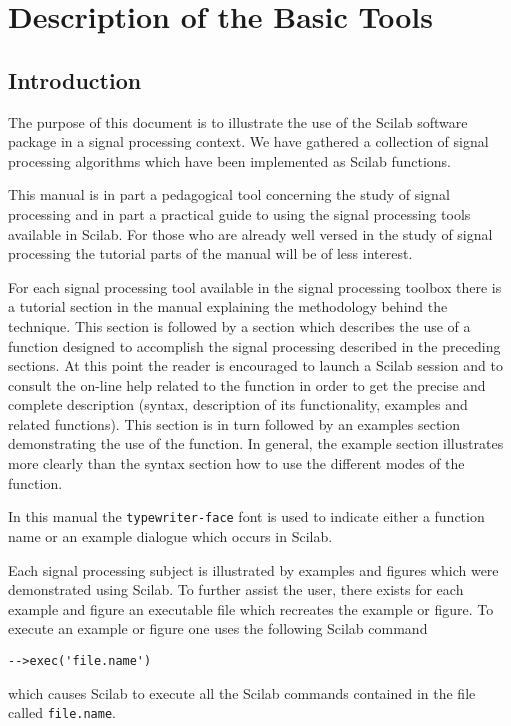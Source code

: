 
\chapter{Description of the Basic Tools}

\section{Introduction}

The purpose of this document is to illustrate the use of the Scilab software
package
in a signal processing context.
We have gathered a collection of signal processing 
algorithms which have been implemented 
as Scilab functions. 

	This manual is in part a pedagogical tool concerning
the study of signal processing and in part a practical guide
to using the signal processing tools available in Scilab. 
For those who are already well versed in the study of signal processing 
the tutorial parts of the manual will be of less interest. 

	For each signal processing tool available in the signal 
processing toolbox there is a tutorial section in the manual explaining the
methodology behind the technique. This  section is followed by a 
section which describes the use  of a function designed to 
accomplish the signal processing described in the preceding sections.  
At this point the reader is encouraged to launch a Scilab session and to
consult the on-line help related to the function in order to get the precise 
and complete description (syntax, description of its functionality, examples 
and related functions). This
section is in turn followed by an examples section demonstrating the
use of the function.  In general, the example section illustrates
more clearly than the syntax section how to use the different modes
of the function.

	In this manual the {\tt typewriter-face} font is used to indicate
either a function name or an example dialogue which occurs in Scilab.

	Each signal processing subject is illustrated by examples
and figures which were demonstrated using Scilab.
To further assist the user, there exists for each example and figure an 
executable file which recreates the example or figure.  
To execute an example or figure one uses the following Scilab command
\begin{verbatim}
-->exec('file.name')
\end{verbatim}
which causes Scilab to execute all the Scilab commands contained
in the file called {\tt file.name}.  


